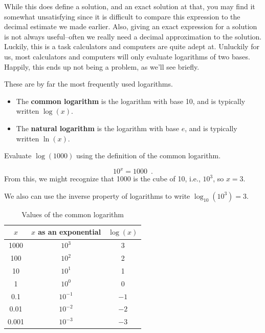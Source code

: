 While this does define a solution, and an exact solution at that, you may find it somewhat unsatisfying since it is difficult to compare this expression to the decimal estimate we made earlier. Also, giving an exact expression for a solution is not always useful–often we really need a decimal approximation to the solution. Luckily, this is a task calculators and computers are quite adept at. Unluckily for us, most calculators and computers will only evaluate logarithms of two bases. Happily, this ends up not being a problem, as we’ll see briefly.

\begin{definition} These are by far the most frequently used logarithms.
  \begin{itemize}
    \item The {\bf common logarithm} is the logarithm with base 10, and is typically written $\log(x)$.
    \item The {\bf natural logarithm} is the logarithm with base $e$, and is typically written $\ln(x)$.
  \end{itemize}
\end{definition}
\begin{example}
Evaluate $\log(1000)$ using the definition of the common logarithm.

\begin{solution}  $$10^x=1000 \enspace .$$
From this, we might recognize that 1000 is the cube of 10, i.e., $10^3$, so $x=3$.

We also can use the inverse property of logarithms  to write $\log_{10}(10^3)=3$.
\end{solution}\end{example}
\begin{table}[!ht]
\centering
\caption{Values of the common logarithm}
\begin{tabular}{ccc}
  \toprule
  $x$ & $x$ as an exponential	& $\log(x)$\\
  \midrule
  1000 & $10^3$ &	3\\
  100 &	$10^2$ &	2	\\
  10 &	$10^1$ &	1	\\
  1 &	$10^0$ &	0\\
	0.1 &	$10^{-1}$ &	$-1$\\
  0.01 &	$10^{-2}$ &	$-2$\\
  0.001 &	$10^{-3}$ &	$-3$\\
  \bottomrule
\end{tabular}
\end{table}

